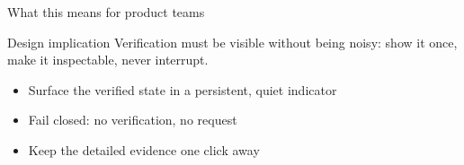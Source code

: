 \documentclass[aspectratio=169,11pt]{beamer}
\begin{document}
\begin{frame}{What this means for product teams}
  \begin{block}{Design implication}
    Verification must be visible without being noisy: show it once, make it inspectable, never interrupt.
  \end{block}
  \begin{itemize}
    \item Surface the verified state in a persistent, quiet indicator
    \item Fail closed: no verification, no request
    \item Keep the detailed evidence one click away
  \end{itemize}
\end{frame}

\begin{frame}[plain]
  \vspace{4em}{\Huge\bfseries Thank you}\par{}
\end{frame}
\end{document}
